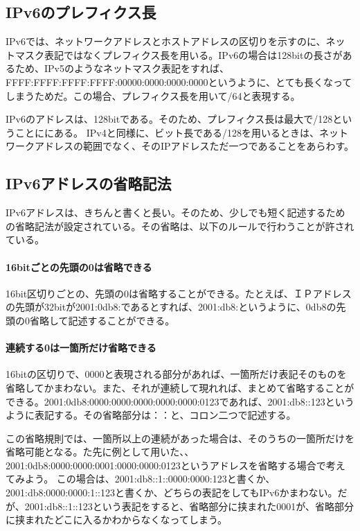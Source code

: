 \subsection{IPv6のプレフィクス長}
IPv6では、ネットワークアドレスとホストアドレスの区切りを示すのに、ネットマスク表記ではなくプレフィクス長を用いる。IPv6の場合は128bitの長さがあるため、IPv5のようなネットマスク表記をすれば、FFFF:FFFF:FFFF:FFFF:00000:0000:0000:0000というように、とても長くなってしまうためだ。この場合、プレフィクス長を用いて/64と表現する。

IPv6のアドレスは、128bitである。そのため、プレフィクス長は最大で/128ということににある。
IPv4と同様に、ビット長である/128を用いるときは、ネットワークアドレスの範囲でなく、そのIPアドレスただ一つであることをあらわす。


\subsection{IPv6アドレスの省略記法}
IPv6アドレスは、きちんと書くと長い。そのため、少しでも短く記述するための省略記法が設定されている。その省略は、以下のルールで行わうことが許されている。

\paragraph{16bitごとの先頭の0は省略できる}
16bit区切りごとの、先頭の0は省略することができる。たとえば、ＩＰアドレスの先頭が32bitが2001:0db8:であるとすれば、2001:db8:というように、0db8の先頭の0省略して記述することができる。

\paragraph{連続する0は一箇所だけ省略できる}
16bitの区切りで、0000と表現される部分があれば、一箇所だけ表記そのものを省略してかまわない。また、それが連続して現れれば、まとめて省略することができる。2001:0db8:0000:0000:0000:0000:0000:0123であれば、2001:db8::123というように表記する。その省略部分は：：と、コロン二つで記述する。

この省略規則では、一箇所以上の連続があった場合は、そのうちの一箇所だけを省略可能となる。た先に例として用いた、、2001:0db8:0000:0000:0001:0000:0000:0123というアドレスを省略する場合で考えてみよう。
この場合は、2001:db8::1::0000:0000:123と書くか、2001:db8:0000:0000:1::123と書くか、どちらの表記をしてもIPv6かまわない。だが、2001:db8::1::123という表記をすると、省略部分に挟まれた0001が、省略部分に挟まれたどこに入るかわからなくなってしまう。

